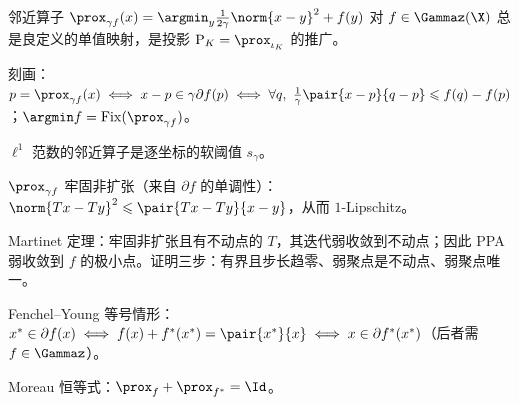 \begin{keypoints}
  \item 邻近算子 $\prox_{\gamma f}(x)=\argmin_y\frac1{2\gamma}\norm{x-y}^2+f(y)$ 对 $f\in\Gammaz(\X)$ 总是良定义的单值映射，是投影 $\mathrm P_K=\prox_{\iota_K}$ 的推广。
  \item 刻画：$p=\prox_{\gamma f}(x)\iff x-p\in\gamma\partial f(p)\iff\forall q,\ \frac1\gamma\pair{x-p}{q-p}\leqslant f(q)-f(p)$；$\argmin f=\Fix(\prox_{\gamma f})$。
  \item $\ell^1$ 范数的邻近算子是逐坐标的软阈值 $s_\gamma$。
  \item $\prox_{\gamma f}$ 牢固非扩张（来自 $\partial f$ 的单调性）：$\norm{Tx-Ty}^2\leqslant\pair{Tx-Ty}{x-y}$，从而 $1$-Lipschitz。
  \item Martinet 定理：牢固非扩张且有不动点的 $T$，其迭代弱收敛到不动点；因此 PPA 弱收敛到 $f$ 的极小点。证明三步：有界且步长趋零、弱聚点是不动点、弱聚点唯一。
  \item Fenchel--Young 等号情形：$x^*\in\partial f(x)\iff f(x)+f^*(x^*)=\pair{x^*}{x}\iff x\in\partial f^*(x^*)$（后者需 $f\in\Gammaz$）。
  \item Moreau 恒等式：$\prox_f+\prox_{f^*}=\Id$。
\end{keypoints}
